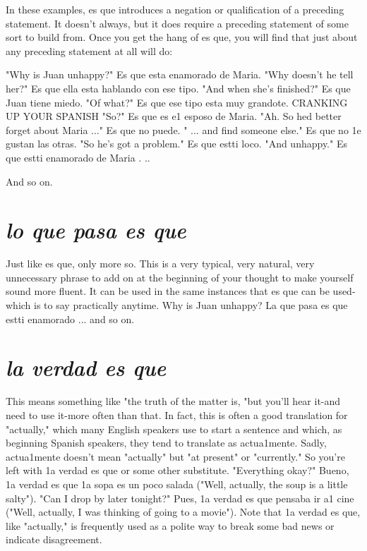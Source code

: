 \documentclass[14pt,a4paper,oneside]{memoir}
\newcommand{\bsk}{\vspace{20pt}}
\begin{document}
In these examples, es que introduces a negation or qualification of a preceding statement. It doesn't always, but it does require a preceding statement of some sort to build from. Once you get the hang of es
que, you will find that just about any preceding statement at all will do:

\bsk

"Why is Juan unhappy?"
Es que esta enamorado de Maria.
"Why doesn't he tell her?"
Es que ella esta hablando con ese tipo.
"And when she's finished?"
Es que Juan tiene miedo.
"Of what?"
Es que ese tipo esta muy grandote.
CRANKING UP YOUR SPANISH
"So?"
Es que es e1 esposo de Maria.
"Ah. So hed better forget about Maria ..."
Es que no puede.
" ... and find someone else."
Es que no 1e gustan las otras.
"So he's got a problem."
Es que estti loco.
"And unhappy."
Es que estti enamorado de Maria . ..

\bsk

And so on.

\section{\emph{lo que pasa es que}}

Just like es que, only more so. This is a very typical, very
natural, very unnecessary phrase to add on at the beginning of your
thought to make yourself sound more fluent. It can be used in the
same instances that es que can be used-which is to say practically
anytime. Why is Juan unhappy? La que pasa es que estti
enamorado ... and so on.

\section{\emph{la verdad es que}}

This means something like "the truth of the matter is, "but
you'll hear it-and need to use it-more often than that. In fact, this is
often a good translation for "actually," which many English speakers
use to start a sentence and which, as beginning Spanish speakers, they
tend to translate as actua1mente. Sadly, actua1mente doesn't mean
"actually" but "at present" or "currently." So you're left with 1a verdad es que or some other substitute. "Everything okay?" Bueno, 1a
verdad es que 1a sopa es un poco salada ("Well, actually, the soup is a
little salty"). "Can I drop by later tonight?" Pues, 1a verdad es que pensaba ir a1 cine ("Well, actually, I was thinking of going to a movie").
Note that 1a verdad es que, like "actually," is frequently used as a polite way to break some bad news or indicate disagreement.
\end{document}
